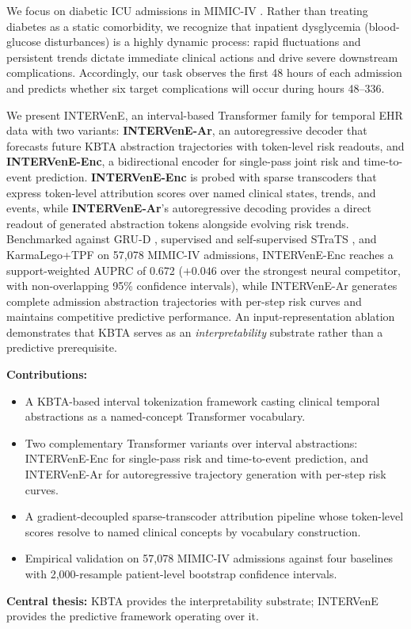 \documentclass[letterpaper]{article} %
\begin{document}
We focus on diabetic ICU admissions in MIMIC-IV \citep{johnson2023mimiciv}. Rather than treating diabetes as a static comorbidity, we recognize that inpatient dysglycemia (blood-glucose disturbances) is a highly dynamic process: rapid fluctuations and persistent trends dictate immediate clinical actions and drive severe downstream complications. Accordingly, our task observes the first 48 hours of each admission and predicts whether six target complications will occur during hours 48--336.

We present INTERVenE, an interval-based Transformer family for temporal EHR data with two variants: \textbf{INTERVenE-Ar}, an autoregressive decoder that forecasts future KBTA abstraction trajectories with token-level risk readouts, and \textbf{INTERVenE-Enc}, a bidirectional encoder for single-pass joint risk and time-to-event prediction. \textbf{INTERVenE-Enc} is probed with sparse transcoders that express token-level attribution scores over named clinical states, trends, and events, while \textbf{INTERVenE-Ar}'s autoregressive decoding provides a direct readout of generated abstraction tokens alongside evolving risk trends. Benchmarked against GRU-D \citep{che2018recurrent}, supervised and self-supervised STraTS \citep{tipirneni2022strats}, and KarmaLego+TPF \citep{moskovitch2015karmalego,sheetrit2019tpf} on 57,078 MIMIC-IV admissions, INTERVenE-Enc reaches a support-weighted AUPRC of 0.672 ($+0.046$ over the strongest neural competitor, with non-overlapping 95\% confidence intervals), while INTERVenE-Ar generates complete admission abstraction trajectories with per-step risk curves and maintains competitive predictive performance. An input-representation ablation demonstrates that KBTA serves as an \emph{interpretability} substrate rather than a predictive prerequisite.

\noindent\textbf{Contributions:}
\begin{itemize}\setlength{\itemsep}{.1em}
  \item A KBTA-based interval tokenization framework casting clinical temporal abstractions as a named-concept Transformer vocabulary.
  \item Two complementary Transformer variants over interval abstractions: INTERVenE-Enc for single-pass risk and time-to-event prediction, and INTERVenE-Ar for autoregressive trajectory generation with per-step risk curves.
  \item A gradient-decoupled sparse-transcoder attribution pipeline whose token-level scores resolve to named clinical concepts by vocabulary construction.
  \item Empirical validation on 57{,}078 MIMIC-IV admissions against four baselines with 2{,}000-resample patient-level bootstrap confidence intervals.
\end{itemize}
\noindent\textbf{Central thesis:} KBTA provides the interpretability substrate; INTERVenE provides the predictive framework operating over it.
\end{document}

